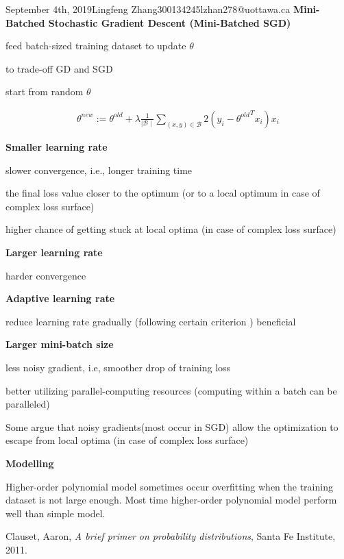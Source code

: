 \documentclass{article}
\begin{document}
\begin{lecture}{September 4th, 2019}{Lingfeng Zhang}{300134245}{lzhan278@uottawa.ca}
\textbf{Mini-Batched Stochastic Gradient Descent (Mini-Batched SGD)}

feed batch-sized training dataset to update $\theta$ 

to trade-off GD and SGD

start from random $\theta$

\begin{eqnarray}
\theta^{new} := \theta^{old} + \lambda\frac{1}{\mid\mathcal{B}\mid}\sum_{(x,y)\in\mathcal{B}}2(y_i-{\theta^{old}} ^T x_i)x_i
\end{eqnarray}

\textbf{Smaller learning rate}

slower convergence, i.e., longer training time

the final loss value closer to the optimum (or to a local optimum in case of complex loss surface)

higher chance of getting stuck at local optima (in case of complex loss surface)

\textbf{Larger learning rate}

harder convergence

\textbf{Adaptive learning rate}

reduce learning rate gradually (following certain criterion
)
beneficial

\textbf{Larger mini-batch size}

less noisy gradient, i.e, smoother drop of training loss

better utilizing parallel-computing resources (computing within a batch can be paralleled)

Some argue that noisy gradients(most occur in SGD) allow the optimization to escape from local optima (in case of complex loss surface)


\textbf{Modelling}

Higher-order polynomial model sometimes occur overfitting when the training dataset is not large enough. Most time higher-order polynomial model perform well than simple model.


\begin{thebibliography}{999}
  Clauset, Aaron,
  \textit{A brief primer on probability distributions},
  Santa Fe Institute,
  2011.
\end{thebibliography}

\end{lecture}
\end{document}
